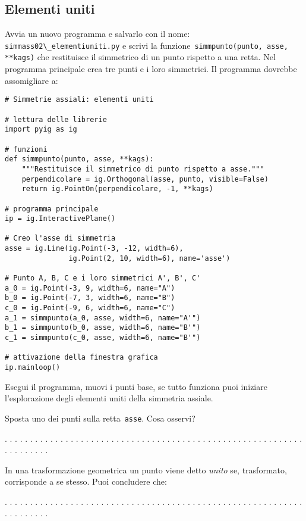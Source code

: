 \subsection{Elementi uniti}

Avvia un nuovo programma e salvarlo con il nome: 
\lstinline{simmass02\_elementiuniti.py}
e scrivi la funzione~\lstinline{simmpunto(punto, asse, **kags)} che restituisce 
il simmetrico di un punto rispetto a una retta.
Nel programma principale crea tre punti e i loro simmetrici.
Il programma dovrebbe assomigliare a:

\begin{lstlisting}
# Simmetrie assiali: elementi uniti

# lettura delle librerie
import pyig as ig

# funzioni
def simmpunto(punto, asse, **kags):
    """Restituisce il simmetrico di punto rispetto a asse."""
    perpendicolare = ig.Orthogonal(asse, punto, visible=False)
    return ig.PointOn(perpendicolare, -1, **kags)

# programma principale
ip = ig.InteractivePlane()

# Creo l'asse di simmetria
asse = ig.Line(ig.Point(-3, -12, width=6),
               ig.Point(2, 10, width=6), name='asse')

# Punto A, B, C e i loro simmetrici A', B', C'
a_0 = ig.Point(-3, 9, width=6, name="A")
b_0 = ig.Point(-7, 3, width=6, name="B")
c_0 = ig.Point(-9, 6, width=6, name="C")
a_1 = simmpunto(a_0, asse, width=6, name="A'")
b_1 = simmpunto(b_0, asse, width=6, name="B'")
c_1 = simmpunto(c_0, asse, width=6, name="B'")

# attivazione della finestra grafica
ip.mainloop()
\end{lstlisting}

Esegui il programma, muovi i punti base, se tutto funziona puoi iniziare
l'esplorazione degli elementi uniti della simmetria assiale.

Sposta uno dei punti sulla retta~\lstinline{asse}. Cosa osservi?

. . . . . . . . . . . . . . . . . . . . . . . . . . . . . . . . . . . . . . . .
. . . . . . . . . . . . . . . . . . . . . . . . . . . .

In una trasformazione geometrica un punto viene detto \emph{unito} se, 
trasformato, corrisponde a se stesso. Puoi concludere che:

. . . . . . . . . . . . . . . . . . . . . . . . . . . . . . . . . . . . . . . .
. . . . . . . . . . . . . . . . . . . . . . . . . . . .

